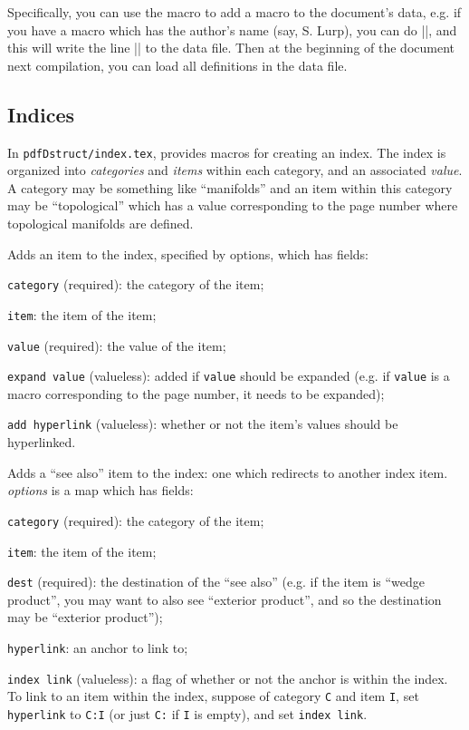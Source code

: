 Specifically, you can use the \macro\docdata\anchormacro\docdata{} macro to add a macro to the document's data, e.g. if you have a macro \macro\name{} which has the author's name (say, S. Lurp), you can do
\inlinecode|\docdata\name|, and this will write the line \inlinecode|\gdef\name{S. Lurp}| to the data file.
Then at the beginning of the document next compilation, you can load all definitions in the data file.

\subsection{Indices}

In {\tt pdfDstruct/index.tex}, \pdftoolbox{} provides macros for creating an index.
The index is organized into {\it categories} and {\it items} within each category, and an associated {\it value}.
A category may be something like ``manifolds'' and an item within this category may be ``topological'' which has a value corresponding to the page number where topological manifolds are defined.

Adds an item to the index, specified by options, which has fields:
\benum
    \item {\tt category} (required): the category of the item;
    \item {\tt item}: the item of the item;
    \item {\tt value} (required): the value of the item;
    \item {\tt expand value} (valueless): added if {\tt value} should be expanded (e.g. if {\tt value} is a macro corresponding to the page number, it needs to be expanded);
    \item {\tt add hyperlink} (valueless): whether or not the item's values should be hyperlinked.
\eenum
\emacroexp

Adds a ``see also'' item to the index: one which redirects to another index item.
{\it options} is a map which has fields:
\benum
    \item {\tt category} (required): the category of the item;
    \item {\tt item}: the item of the item;
    \item {\tt dest} (required): the destination of the ``see also'' (e.g. if the item is ``wedge product'', you may want to also see ``exterior product'', and so the destination may be ``exterior product'');
    \item {\tt hyperlink}: an anchor to link to;
    \item {\tt index link} (valueless): a flag of whether or not the anchor is within the index.
\eenum
To link to an item within the index, suppose of category {\tt C} and item {\tt I}, set {\tt hyperlink} to {\tt C:I} (or just {\tt C:} if {\tt I} is empty), and set {\tt index link}.
\emacroexp

